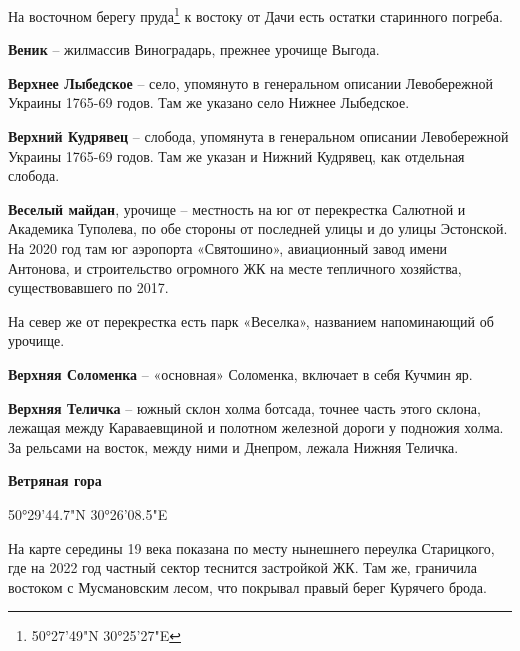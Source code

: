 На восточном берегу пруда\footnote{50°27'49"N 30°25'27"E} к востоку от Дачи есть остатки старинного погреба.\\  

\medskip

\textbf{Веник} – жилмассив Виноградарь, прежнее урочище Выгода.\\

\medskip

\textbf{Верхнее Лыбедское} – село, упомянуто в генеральном описании Левобережной Украины 1765-69 годов. Там же указано село Нижнее Лыбедское.\\

\medskip

\textbf{Верхний Кудрявец} – слобода, упомянута в генеральном описании Левобережной Украины 1765-69 годов. Там же указан и Нижний Кудрявец, как отдельная слобода.\\

\medskip

\textbf{Веселый майдан}, урочище – местность на юг от перекрестка Салютной и Академика Туполева, по обе стороны от последней улицы и до улицы Эстонской. На 2020 год там юг аэропорта «Святошино», авиационный завод имени Антонова, и строительство огромного ЖК на месте тепличного хозяйства, существовавшего по 2017. 

На север же от перекрестка есть парк «Веселка», названием напоминающий об урочище.\\

\medskip

\textbf{Верхняя Соломенка} – «основная» Соломенка, включает в себя Кучмин яр.\\

\medskip

\textbf{Верхняя Теличка} – южный склон холма ботсада, точнее часть этого склона, лежащая между Караваевщиной и полотном железной дороги у подножия холма. За рельсами на восток, между ними и Днепром, лежала Нижняя Теличка.\\

\medskip

\textbf{Ветряная гора}

50°29'44.7"N 30°26'08.5"E

На карте середины 19 века показана по месту нынешнего переулка Старицкого, где на 2022 год частный сектор теснится застройкой ЖК. Там же, граничила востоком с Мусмановским лесом, что покрывал правый берег Курячего брода.\\

